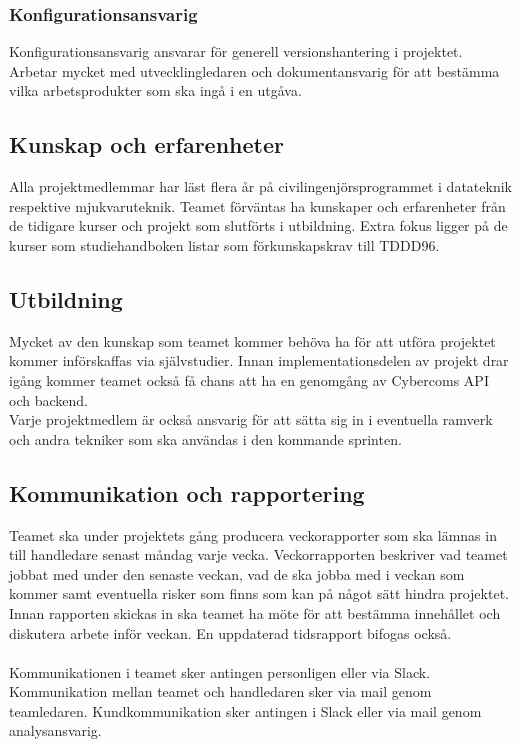 \subsubsection*{Konfigurationsansvarig}
Konfigurationsansvarig ansvarar för generell versionshantering i projektet. Arbetar mycket med utvecklingledaren och dokumentansvarig för att bestämma vilka arbetsprodukter som ska ingå i en utgåva.


\subsection{Kunskap och erfarenheter}
Alla projektmedlemmar har läst flera år på civilingenjörsprogrammet i datateknik respektive mjukvaruteknik. Teamet förväntas ha kunskaper och erfarenheter från de tidigare kurser och projekt som slutförts i utbildning. Extra fokus ligger på de kurser som studiehandboken listar som förkunskapskrav till TDDD96\cite{bib-tddd96}.


\subsection{Utbildning}
Mycket av den kunskap som teamet kommer behöva ha för att utföra projektet kommer införskaffas via självstudier. Innan implementationsdelen av projekt drar igång kommer teamet också få chans att ha en genomgång av Cybercoms API och backend.
\\
Varje projektmedlem är också ansvarig för att sätta sig in i eventuella ramverk och andra tekniker som ska användas i den kommande sprinten.

\subsection{Kommunikation och rapportering}
Teamet ska under projektets gång producera veckorapporter som ska lämnas in till handledare senast måndag varje vecka. Veckorrapporten beskriver vad teamet jobbat med under den senaste veckan, vad de ska jobba med i veckan som kommer samt eventuella risker som finns som kan på något sätt hindra projektet. Innan rapporten skickas in ska teamet ha möte för att bestämma innehållet och diskutera arbete inför veckan. En uppdaterad tidsrapport bifogas också.\\
\\
Kommunikationen i teamet sker antingen personligen eller via Slack. Kommunikation mellan teamet och handledaren sker via mail genom teamledaren. Kundkommunikation sker antingen i Slack eller via mail genom analysansvarig.

\pagebreak
